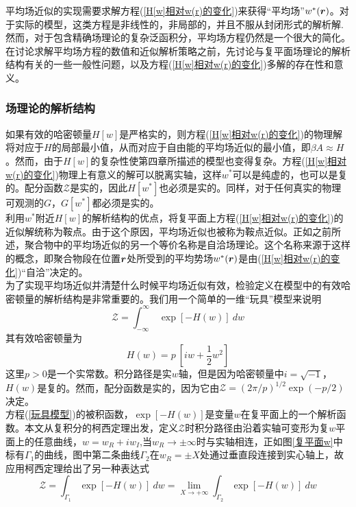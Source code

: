 平均场近似的实现需要求解方程(\ref{H[w]相对w(r)的变化})来获得“平均场”$w^*(\bm{r})$。对于实际的模型，这类方程是非线性的，非局部的，并且不服从封闭形式的解析解.然而，对于包含精确场理论的复杂泛函积分，平均场方程仍然是一个很大的简化。在讨论求解平均场方程的数值和近似解析策略之前，先讨论与复平面场理论的解析结构有关的一些一般性问题，以及方程(\ref{H[w]相对w(r)的变化})多解的存在性和意义。\\
\subsubsection{场理论的解析结构}
如果有效的哈密顿量$H[w]$是严格实的，则方程(\ref{H[w]相对w(r)的变化})的物理解将对应于$H$的局部最小值，从而对应于自由能的平均场近似的最小值，即$\beta A \approx H $。然而，由于$H[w]$的复杂性使第四章所描述的模型也变得复杂。方程(\ref{H[w]相对w(r)的变化})物理上有意义的解可以脱离实轴，这样$w^*$可以是纯虚的，也可以是复的。配分函数$\mathcal{Z}$是实的，因此$H[w^*]$也必须是实的。同样，对于任何真实的物理可观测的$G$，$G[w^*]$都必须是实的。\\

利用$w^*$附近$H[w]$的解析结构的优点，将复平面上方程(\ref{H[w]相对w(r)的变化})的近似解统称为鞍点。由于这个原因，平均场近似也被称为鞍点近似。正如之前所述，聚合物中的平均场近似的另一个等价名称是自洽场理论。这个名称来源于这样的概念，即聚合物段在位置$\bm{r}$处所受到的平均势场$w^*(\bm{r})$是由(\ref{H[w]相对w(r)的变化})“自洽”决定的。\\

为了实现平均场近似并清楚什么时候平均场近似有效，检验定义在模型中的有效哈密顿量的解析结构是非常重要的。我们用一个简单的一维“玩具”模型来说明\\
\begin{equation}
\mathcal{Z} = \int_{-\infty}^{\infty}\ \exp[-H(w)]\ dw \label{玩具模型}
\end{equation}
其有效哈密顿量为\\
 \begin{equation}
 H(w) = p \ \left[iw+ \frac{1}{2} w^2\right] \label{有效哈密顿量}
 \end{equation}
这里$p>0$是一个实常数。积分路径是实$w$轴，但是因为哈密顿量中$i=\sqrt{-1}$，$H(w)$是复的。然而，配分函数是实的，因为它由$\mathcal{Z}=(2\pi/p)^{1/2} \exp(-p/2)$决定。\\

方程(\ref{玩具模型})的被积函数，$\exp[-H(w)]$是变量$w$在复平面上的一个解析函数。本文从复积分的柯西定理出发，定义$\mathcal{Z}$时积分路径由沿着实轴可变形为复$w$平面上的任意曲线，$w = w_R +iw_I$,当$w_R \rightarrow  \pm \infty$时与实轴相连，正如图\ref{复平面w}中标有$\Gamma_1$的曲线，图中第二条曲线$\Gamma_2$在$w_R=\pm X$处通过垂直段连接到实心轴上，故应用柯西定理给出了另一种表达式\\
\begin{equation}
\mathcal{Z} = \int_{\Gamma_1} \exp [-H(w)] \ dw = \lim_{X \rightarrow +\infty} \int_{\Gamma_2} \exp[-H(w)] \ dw   \label{Z的另一种表达式}
\end{equation}

